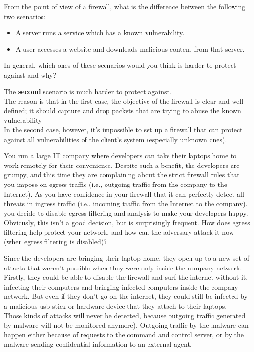 \documentclass[11pt, a4paper, addpoints, answers]{exam}
\begin{document}
\begin{questions}
\question[3] From the point of view of a firewall, what is the difference between the following two scenarios:
\begin{itemize}
	\item A server runs a service which has a known vulnerability.
	\item A user accesses a website and downloads malicious content from that server.
\end{itemize}
In general, which ones of these scenarios would you think is harder to protect against and why?
\begin{solution}
	The \textbf{second} scenario is much harder to protect against.\\
	The reason is that in the first case, the objective of the firewall is clear and well-defined; it should capture and drop packets that are trying to abuse the known vulnerability.\\
	In the second case, however, it's impossible to set up a firewall that can protect against all vulnerabilities of the client's system (especially unknown ones).
\end{solution}


\question[2] You run a large IT company where developers can take their laptops
home to work remotely for their convenience. Despite such a benefit, the
developers are grumpy, and this time they are complaining about the strict
firewall rules that you impose on egress traffic (i.e., outgoing traffic from
the company to the Internet). As you have confidence in your firewall that it
can perfectly detect all threats in ingress traffic (i.e., incoming traffic
from the Internet to the company), you decide to disable egress filtering and
analysis to make your developers happy.  Obviously, this isn't a good decision,
but is surprisingly frequent. How does egress filtering help protect your
network, and how can the adversary attack it now (when egress filtering is disabled)?

\begin{solution}
Since the developers are bringing their laptop home, they open up to a new set of attacks
that weren't possible when they were only inside the company network. \\
Firstly, they could be able to disable the firewall and surf the internet without it, 
infecting their computers and bringing infected computers inside the company network.
But even if they don't go on the internet, they could still be infected by a malicious 
usb stick or hardware device that they attach to their laptops.\\
Those kinds of attacks will never be detected, because outgoing traffic generated by malware
will not be monitored anymore). Outgoing traffic by the malware can happen either because
of requests to the command and control server, or by the malware sending confidential information
to an external agent.
\end{solution}


\end{questions}
\end{document}
